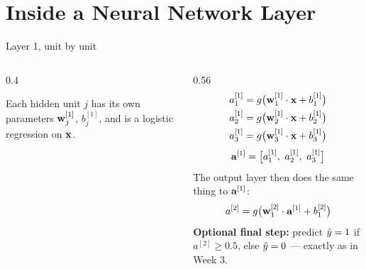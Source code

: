 \documentclass[aspectratio=169,10pt]{beamer}
\begin{document}
\section{Inside a Neural Network Layer}

\begin{frame}{Layer 1, unit by unit}
  \begin{columns}[T,onlytextwidth]
    \begin{column}{0.4\textwidth}
      \centering
      \vspace{1mm}

      \footnotesize
      Each hidden unit $j$ has its own parameters $\mathbf{w}^{[1]}_j$, $b^{[1]}_j$, and is a
      logistic regression on $\mathbf{x}$.
    \end{column}
    \begin{column}{0.56\textwidth}
      \small
      \begin{align*}
        a^{[1]}_1 &= g\bigl(\mathbf{w}^{[1]}_1\cdot\mathbf{x} + b^{[1]}_1\bigr)\\
        a^{[1]}_2 &= g\bigl(\mathbf{w}^{[1]}_2\cdot\mathbf{x} + b^{[1]}_2\bigr)\\
        a^{[1]}_3 &= g\bigl(\mathbf{w}^{[1]}_3\cdot\mathbf{x} + b^{[1]}_3\bigr)
      \end{align*}
      \vspace{-3mm}
      \[ \mathbf{a}^{[1]} = \bigl[a^{[1]}_1,\ a^{[1]}_2,\ a^{[1]}_3\bigr] \]
      \footnotesize
      The output layer then does the same thing to $\mathbf{a}^{[1]}$:
      \[ a^{[2]} = g\bigl(\mathbf{w}^{[2]}_1\cdot\mathbf{a}^{[1]} + b^{[2]}_1\bigr) \]
      \textbf{Optional final step:} predict $\hat{y}=1$ if $a^{[2]}\ge 0.5$, else $\hat{y}=0$ ---
      exactly as in Week 3.
    \end{column}
  \end{columns}
\end{frame}
\end{document}
